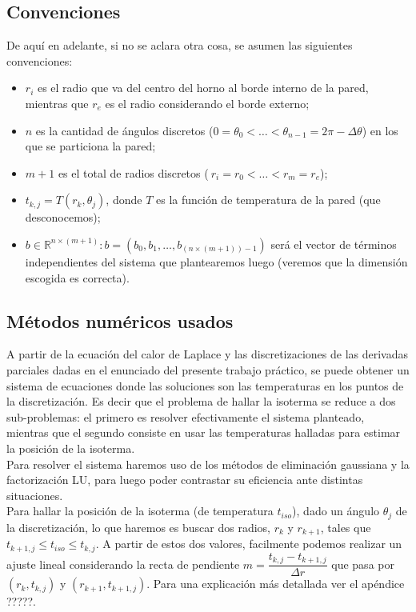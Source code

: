 \subsection{Convenciones}
De aquí en adelante, si no se aclara otra cosa, se asumen las siguientes convenciones:
\begin{itemize}
\item$r_i$ es el radio que va del centro del horno al borde interno de la pared, mientras que $r_e$ es el radio considerando el borde externo;
\item$n$ es la cantidad de ángulos discretos ($0=\theta_0 <\hdots< \theta_{n-1} = 2\pi - \Delta \theta$) en los que se particiona la pared;
\item$m+1$ es el total de radios discretos ($~{r_i=r_0<\hdots<r_m=r_e}$); 
\item$t_{k,j} = T(r_k, \theta_j)$, donde $T$ es la función de temperatura de la pared (que desconocemos);
\item$b\in \mathbb{R}^{n\times (m+1)}: b = (b_0, b_1, \hdots, b_{(n\times (m+1))-1})$ será el vector de términos independientes del sistema que plantearemos luego (veremos que la dimensión escogida es correcta). 
\end{itemize}
\subsection{Métodos numéricos usados}
A partir de la ecuación del calor de Laplace y las discretizaciones de las derivadas parciales dadas en el enunciado del presente trabajo práctico, se puede obtener un sistema de ecuaciones donde las soluciones son las temperaturas en los puntos de la discretización. 
Es decir que el problema de hallar la isoterma se reduce a dos sub-problemas: el primero es resolver efectivamente el sistema planteado, mientras que el segundo consiste en usar las temperaturas halladas para estimar la posición de la isoterma.\\
Para resolver el sistema haremos uso de los métodos de eliminación gaussiana y la factorización LU, para luego poder contrastar su eficiencia ante distintas situaciones.\\
Para hallar la posición de la isoterma (de temperatura $t_{iso}$), dado un ángulo $\theta_j$ de la discretización, lo que haremos es buscar dos radios, $r_k$ y $r_{k+1}$, tales que $t_{k+1,j} \leq t_{iso} \leq t_{k, j}$. A partir de estos dos valores, facilmente podemos realizar un ajuste lineal considerando la recta de pendiente $m = \dfrac{t_{k,j}-t_{k+1,j}}{\Delta r}$ que pasa por $(r_k,t_{k,j})$ y $(r_{k+1}, t_{k+1,j})$. Para una explicación más detallada ver el apéndice ?????.

